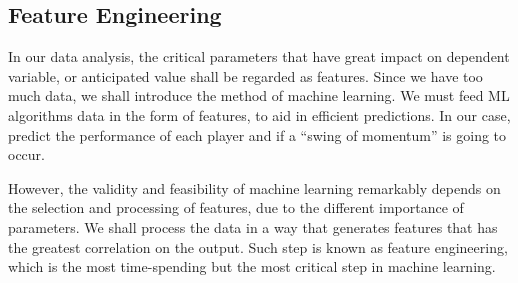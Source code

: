 \documentclass[UTF8]{mcmthesis}
\begin{document}
	\subsection{Feature Engineering}
	In our data analysis, the critical parameters that have great impact on dependent variable, or anticipated value shall be regarded as features. Since we have too much data, we shall introduce the method of machine learning. We must feed ML algorithms data in the form of features, to aid in efficient predictions. In our case, predict the performance of each player and if a “swing of momentum” is going to occur.
	
	However, the validity and feasibility of machine learning remarkably depends on the selection and processing of features, due to the different importance of parameters. We shall process the data in a way that generates features that has the greatest correlation on the output. Such step is known as feature engineering, which is the most time-spending but the most critical step in machine learning.
	
	
\end{document}
